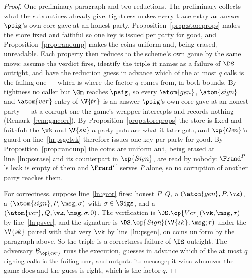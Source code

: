 \documentclass[10pt,oneside,openany]{book}
\theoremstyle{accentdef}
\theoremstyle{accentplain}
\begin{document}
\begin{proof}
One preliminary paragraph and two reductions. The preliminary collects what the subroutines already
give: tightness makes every trace entry an answer $\psig$'s own core gave at an honest party,
Proposition~\ref{prop:storeprops} makes the store fixed and faithful so one key is issued per party
for good, and Proposition~\ref{prop:randunp} makes the coins uniform and, being erased, unreadable.
Each property then reduces to the scheme's own game by the same move: assume the verdict fires,
identify the triple it names as a failure of $\DS$ outright, and have the reduction guess in advance
which of the at most $q$ calls is the failing one --- which is where the factor $q$ comes from, in
both bounds.
By tightness no caller but $\Gm$ reaches $\psig$, so every $\atom{gen}$, $\atom{sign}$ and $\atom{ver}$
entry of $\V{tr}$ is an answer $\psig$'s own core gave at an honest party --- at a corrupt one the
game's wrapper intercepts and records nothing (Remark~\ref{rem:gmcorr}). By
Proposition~\ref{prop:storeprops} the store is fixed and faithful: the $\vk$ and $\V{sk}$ a party
puts are what it later gets, and $\op{Gen}$'s guard on line~\ref{ln:psgetvk} therefore issues one
key per party for good. By Proposition~\ref{prop:randunp} the coins are uniform and, being erased
at line~\ref{ln:pserase} and its counterpart in $\op{Sign}$, are read by nobody: $\Frand^{P}$'s
leak is empty of them and $\Frand^{P}$ serves $P$ alone, so no corruption of another party reaches
them.

For correctness, suppose line~\ref{ln:gcor} fires: honest $P$, $Q$, a $(\atom{gen},P,\vk)$, a
$(\atom{sign},P,\msg,\sigma)$ with $\sigma \in \Sigs$, and a $(\atom{ver},Q,\vk,\msg,\sigma,0)$. The
verification is $\DS.\op{Ver}(\vk,\msg,\sigma)$ by line~\ref{ln:psver}, and the signature is
$\DS.\op{Sign}(\V{sk},\msg;r)$ under the $\V{sk}$ paired with that very $\vk$ by
line~\ref{ln:psgen}, on coins uniform by the paragraph above. So the triple is a correctness
failure of $\DS$ outright. The adversary $\mathcal{B}_{\op{cor}}$ runs the execution, guesses in advance which
of the at most $q$ signing calls is the failing one, and outputs its message; it wins whenever the
game does and the guess is right, which is the factor $q$.


\end{proof}
\end{document}

